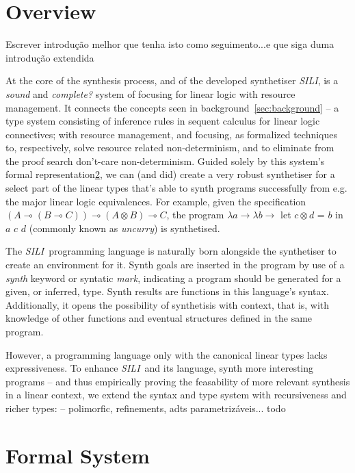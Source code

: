 \documentclass{llncs}
\newcommand{\lolli}{\multimap}
\newcommand{\tensor}{\otimes}
\newcommand{\synname}{\emph{SILI}}
\begin{document}
\section{Overview}

Escrever introdução melhor que tenha isto como seguimento...e que siga duma
introdução extendida

At the core of the synthesis process, and of the developed synthetiser \synname,
is a \emph{sound} and \emph{complete?} system of focusing for linear logic with
resource management. It connects the concepts seen in
background~\ref{sec:background} -- a type system
consisting of inference rules in sequent calculus for linear logic connectives;
with resource management, and focusing, as formalized techniques to,
respectively, solve resource related non-determinism, and to eliminate from the
proof search don't-care non-determinism.  Guided solely by this system's formal
representation\ref{sec:formal_system}, we can (and did) create a very robust
synthetiser for a select part of the linear types that's able to synth
programs successfully from e.g. the major linear logic equivalences. For example,
given the specification $(A \lolli (B \lolli C)) \lolli (A \tensor B) \lolli C$,
the program $\lambda a \rightarrow \lambda b \rightarrow$ let $c \tensor d$ =
$b$ in $a$ $c$ $d$ (commonly known as \emph{uncurry}) is synthetised.

The \synname\ programming language is naturally born alongside the synthetiser
to create an environment for it. Synth goals are inserted in the program by use
of a \emph{synth} keyword or syntatic \emph{mark}, indicating a program should
be generated for a given, or inferred, type. Synth results are functions in this
language's syntax. Additionally, it opens the possibility of synthetisis with
context, that is, with knowledge of other functions and eventual structures
defined in the same program.

However, a programming language only with the canonical linear types lacks
expressiveness. To enhance \synname\ and its language, synth more interesting
programs -- and thus empirically proving the feasability of more relevant
synthesis in a linear context, we extend the syntax and type system with
recursiveness and richer
types: -- polimorfic, refinements, adts parametrizáveis...  todo


\section{Formal System}\label{sec:formal_system}
\end{document}
